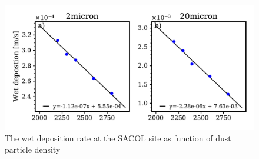 \begin{figure}[hptb]
    \centering
    \includegraphics[width=\textwidth]{texfiles/figs/wetdep_function_of_density.pdf}
    \caption{The wet deposition rate at the SACOL site as function of dust particle density}
    \label{fig:wet_dep_density}
\end{figure}

